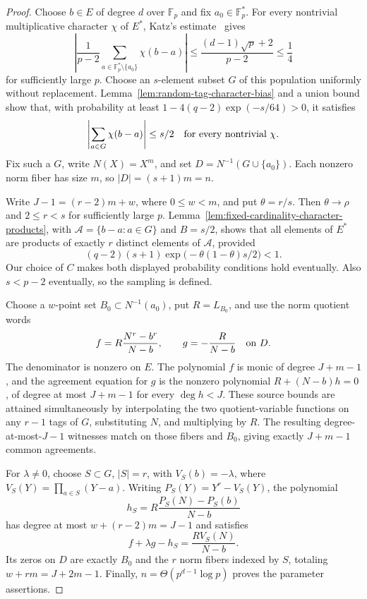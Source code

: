 \begin{proof}
Choose $b\in E$ of degree $d$ over $\mathbb F_p$ and fix
$a_0\in\mathbb F_p^*$.  For every nontrivial multiplicative character
$\chi$ of $E^*$, Katz's estimate~\cite[Theorem~1]{katz1989-character-sums}
gives
\[
 \left|\frac1{p-2}
 \sum_{a\in\mathbb F_p^*\setminus\{a_0\}}\chi(b-a)\right|
 \le\frac{(d-1)\sqrt p+2}{p-2}\le\frac14
\]
for sufficiently large $p$.
Choose an $s$-element subset $G$ of this population uniformly without
replacement.  Lemma~\ref{lem:random-tag-character-bias} and a union bound
show that, with probability at least
$1-4(q-2)\exp(-s/64)>0$, it satisfies
\[
 \left|\sum_{a\in G}\chi(b-a)\right|\le s/2
 \quad\hbox{for every nontrivial $\chi$}.
\]
Fix such a $G$, write $N(X)=X^m$, and set
$D=N^{-1}(G\cup\{a_0\})$.  Each nonzero norm fiber has size $m$,
so $|D|=(s+1)m=n$.

Write $J-1=(r-2)m+w$, where $0\le w<m$, and put $\theta=r/s$.
Then $\theta\to\rho$ and $2\le r<s$ for sufficiently large $p$.
Lemma~\ref{lem:fixed-cardinality-character-products}, with
$\mathcal A=\{b-a:a\in G\}$ and $B=s/2$, shows that all elements of
$E^*$ are products of exactly $r$ distinct elements of $\mathcal A$,
provided
\[
 (q-2)(s+1)\exp\bigl(-\theta(1-\theta)s/2\bigr)<1.
\]
Our choice of $C$ makes both displayed probability conditions hold
eventually.  Also $s<p-2$ eventually, so the sampling is defined.

Choose a $w$-point set $B_0\subset N^{-1}(a_0)$, put $R=L_{B_0}$,
and use the norm quotient words
\[
 f=R\frac{N^r-b^r}{N-b},\qquad g=-\frac R{N-b}
 \quad\hbox{on }D.
\]
The denominator is nonzero on $E$.  The polynomial $f$ is monic of
degree $J+m-1$, and the agreement equation for $g$ is the nonzero
polynomial $R+(N-b)h=0$, of degree at most $J+m-1$ for every
$\deg h<J$.  These source bounds are attained simultaneously by
interpolating the two quotient-variable functions on any $r-1$ tags
of $G$, substituting $N$, and multiplying by $R$.  The resulting
degree-at-most-$J-1$ witnesses match on those fibers and $B_0$,
giving exactly $J+m-1$ common agreements.

For $\lambda\ne0$, choose $S\subset G$, $|S|=r$, with
$V_S(b)=-\lambda$, where $V_S(Y)=\prod_{a\in S}(Y-a)$.
Writing $P_S(Y)=Y^r-V_S(Y)$, the polynomial
\[
 h_S=R\frac{P_S(N)-P_S(b)}{N-b}
\]
has degree at most $w+(r-2)m=J-1$ and satisfies
\[
 f+\lambda g-h_S=\frac{R V_S(N)}{N-b}.
\]
Its zeros on $D$ are exactly $B_0$ and the $r$ norm fibers indexed
by $S$, totaling $w+rm=J+2m-1$.
Finally, $n=\Theta(p^{d-1}\log p)$ proves the parameter assertions.
\end{proof}

